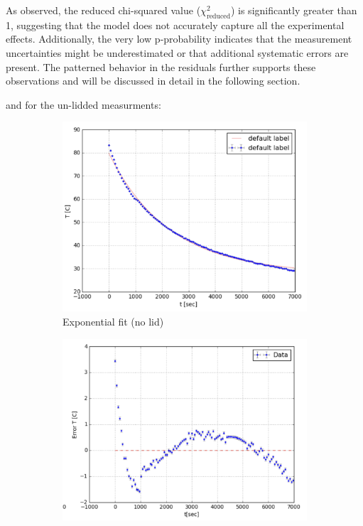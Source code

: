 \documentclass[12pt,a4paper]{report}
\begin{document}
As observed, the reduced chi-squared value ($\chi^2_{\mathrm{reduced}}$) is significantly greater than 1, suggesting that the model does not accurately capture all the experimental effects. Additionally, the very low p‑probability indicates that the measurement uncertainties might be underestimated or that additional systematic errors are present. The patterned behavior in the residuals further supports these observations and will be discussed in detail in the following section.
\pagebreak

and for the un-lidded measurments:

\begin{figure}[htbp]
    \centering
    \begin{subfigure}[b]{0.48\textwidth}
      \includegraphics[width=\textwidth]{no lid/cooling fit.png}
      \caption{Exponential fit (no lid)}
      \label{fig:no lid fit}
    \end{subfigure}
    \hfill
    \begin{subfigure}[b]{0.48\textwidth}
      \includegraphics[width=\textwidth]{no lid/residuals fit.png}

\end{subfigure}
\end{figure}
\end{document}
